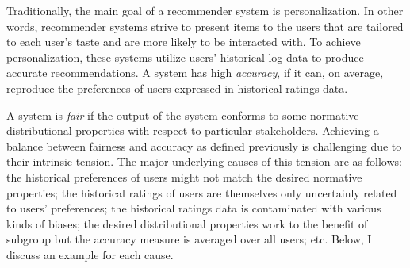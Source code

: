 
Traditionally, the main goal of a recommender system is personalization. In other words, recommender systems strive to present items to the users that are tailored to each user's taste and are more likely to be interacted with. To achieve personalization, these systems utilize users' historical log data to produce accurate recommendations. A system has high \textit{accuracy}, if it can, on average, reproduce the preferences of users expressed in historical ratings data.

A system is \textit{fair} if the output of the system conforms to some normative distributional properties with respect to particular stakeholders. Achieving a balance between fairness and accuracy as defined previously is challenging due to their intrinsic tension. The major underlying causes of this tension are as follows: the historical preferences of users might not match the desired normative properties; the historical ratings of users are themselves only uncertainly related to users’ preferences; the historical ratings data is contaminated with various kinds of biases; the desired distributional properties work to the benefit of subgroup but the accuracy measure is averaged over all users; etc. Below, I discuss an example for each cause.







